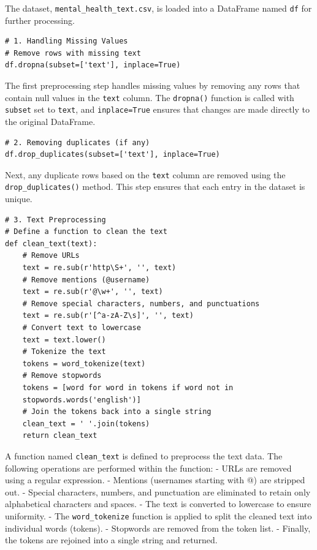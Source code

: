 \noindent
The dataset, \texttt{mental\_health\_text.csv}, is loaded into a DataFrame named \texttt{df} for further processing.

\begin{verbatim}
# 1. Handling Missing Values
# Remove rows with missing text
df.dropna(subset=['text'], inplace=True)
\end{verbatim}

\noindent
The first preprocessing step handles missing values by removing any rows that contain null values in the \texttt{text} column. The \texttt{dropna()} function is called with \texttt{subset} set to \texttt{text}, and \texttt{inplace=True} ensures that changes are made directly to the original DataFrame.

\begin{verbatim}
# 2. Removing duplicates (if any)
df.drop_duplicates(subset=['text'], inplace=True)
\end{verbatim}

\noindent
Next, any duplicate rows based on the \texttt{text} column are removed using 
the \texttt{drop\_duplicates()} method. This step ensures that each entry in the dataset is unique.


\begin{verbatim}
# 3. Text Preprocessing
# Define a function to clean the text
def clean_text(text):
    # Remove URLs
    text = re.sub(r'http\S+', '', text)
    # Remove mentions (@username)
    text = re.sub(r'@\w+', '', text)
    # Remove special characters, numbers, and punctuations
    text = re.sub(r'[^a-zA-Z\s]', '', text)
    # Convert text to lowercase
    text = text.lower()
    # Tokenize the text
    tokens = word_tokenize(text)
    # Remove stopwords
    tokens = [word for word in tokens if word not in 
    stopwords.words('english')]
    # Join the tokens back into a single string
    clean_text = ' '.join(tokens)
    return clean_text
\end{verbatim}

\noindent
A function named \texttt{clean\_text} is defined to preprocess the text data. The following operations are performed within the function:
- URLs are removed using a regular expression.
- Mentions (usernames starting with @) are stripped out.
- Special characters, numbers, and punctuation are eliminated to retain only alphabetical characters and spaces.
- The text is converted to lowercase to ensure uniformity.
- The \texttt{word\_tokenize} function is applied to split the cleaned text into individual words (tokens).
- Stopwords are removed from the token list.
- Finally, the tokens are rejoined into a single string and returned.

